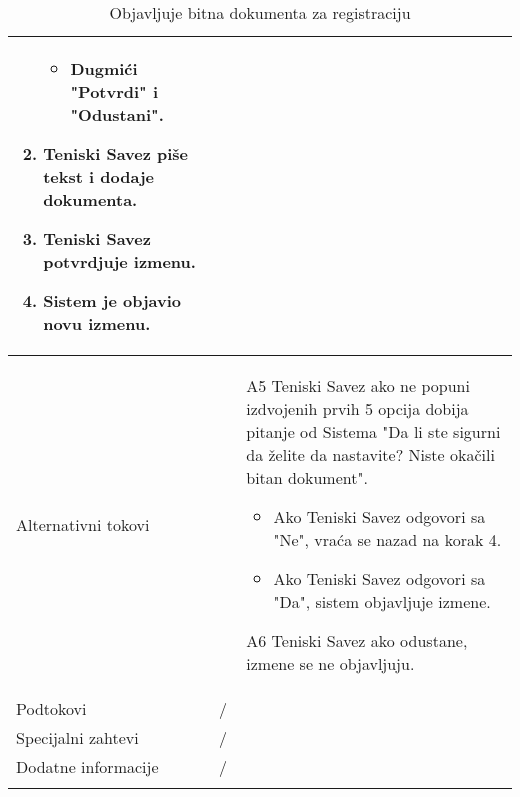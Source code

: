\documentclass{article}
\begin{document}
\begin{longtable}{| p{} | p{} |}
\begin{enumerate}
\begin{itemize}
                        \item Dugmići "Potvrdi" i "Odustani".
                    \end{itemize}
                    \item Teniski Savez piše tekst i dodaje dokumenta.
                    \item Teniski Savez potvrdjuje izmenu.
                    \item Sistem je objavio novu izmenu.
                \end{enumerate}\\
            \hline
                Alternativni tokovi & 
                \begin{itemize}
                    \item[A5] Teniski Savez ako ne popuni izdvojenih prvih 5 opcija dobija pitanje od Sistema "Da li ste sigurni da želite da nastavite? Niste okačili bitan dokument". 
                        \begin{itemize}
                            \item Ako Teniski Savez odgovori sa "Ne", vraća se nazad na korak 4. 
                            \item Ako Teniski Savez odgovori sa "Da", sistem objavljuje izmene.
                        \end{itemize}
                    \item[A6] Teniski Savez ako odustane, izmene se ne objavljuju.
                \end{itemize}\\
            \hline
                Podtokovi & /\\
            \hline
                Specijalni zahtevi & /\\
            \hline
                Dodatne informacije & /\\
            \hline
            \caption{Objavljuje bitna dokumenta za registraciju}
        \end{longtable}
\end{document}
